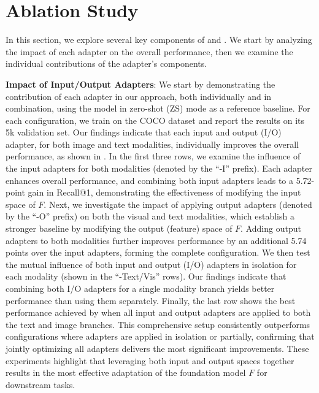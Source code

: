 \section{Ablation Study}
\label{sec:ablation}
In this section, we explore several key components of \ours and \oursp. We start by analyzing the impact of each adapter on the overall performance, then we examine the individual contributions of the adapter's components.


{\bf Impact of Input/Output Adapters}: 
We start by demonstrating the contribution of each adapter in our \ours approach, both individually and in combination, using the model in zero-shot (ZS) mode as a reference baseline. For each configuration, we train on the COCO \citep{COCO} dataset and report the results on its 5k validation set. Our findings indicate that each input and output (I/O) adapter, for both image and text modalities, individually improves the overall performance, as shown in . In the first three rows, we examine the influence of the input adapters for both modalities (denoted by the ``\ours-I'' prefix). Each adapter enhances overall performance, and combining both input adapters leads to a 5.72-point gain in Recall@1, demonstrating the effectiveness of modifying the input space of $F$. Next, we investigate the impact of applying output adapters (denoted by the ``\ours-O'' prefix) on both the visual and text modalities, which establish a stronger baseline by modifying the output (feature) space of $F$. Adding output adapters to both modalities further improves performance by an additional 5.74 points over the input adapters, forming the complete \ours configuration. We then test the mutual influence of both input and output (I/O) adapters in isolation for each modality (shown in the ``\ours-Text/Vis'' rows). Our findings indicate that combining both I/O adapters for a single modality branch yields better performance than using them separately. Finally, the last row shows the best performance achieved by \ours when all input and output adapters are applied to both the text and image branches. This comprehensive setup consistently outperforms configurations where adapters are applied in isolation or partially, confirming that jointly optimizing all adapters delivers the most significant improvements. These experiments highlight that leveraging both input and output spaces together results in the most effective adaptation of the foundation model $F$ for downstream tasks.


